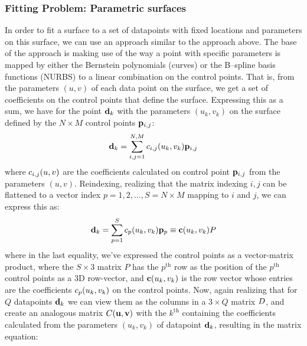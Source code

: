 \subsubsection{Fitting Problem: Parametric surfaces}
In order to fit a \Bez surface to a set of datapoints with fixed locations and parameters on this surface, we can use an approach similar to the approach above. The base of the approach is making use of the way a point with specific parameters is mapped by either the Bernstein polynomials (\Bez curves) or the B--spline basis functions (NURBS) to a linear combination on the control points. That is, from the parameters $(u,v)$ of each data point on the surface, we get a set of coefficients on the control points that define the surface. Expressing this as a sum, we have for the point $\lsDataPointi{k}$ with the parameters $(u_k,v_k)$ on the surface defined by the $N \times M$ control points $\lsControlPointi{i,j}$:
\begin{equation}
\lsDataPointi{k} = \sum\limits_{i,j=1}^{N,M} \lsControlPointCoefi{i,j}(u_k,v_k) \lsControlPointi{i,j}
\end{equation} 
where $\lsControlPointCoefi{i,j}(u,v)$ are the coefficients calculated on control point $\lsControlPointi{i,j}$ from the parameters $(u,v)$. Reindexing, realizing that the matrix indexing $i,j$ can be flattened to a vector index $p = 1,2,...,S=N\times M$ mapping to $i$ and $j$, we can express this as:
\begin{equation}
\lsDataPointi{k} = \sum\limits_{p=1}^{S} \lsControlPointCoefi{p}(u_k,v_k) \lsControlPointi{p} \equiv \vec{\lsControlPointCoef}(u_k,v_k)\lsControlPointMatrix
\label{eqn:lsmatrix1}
\end{equation} 
where in the last equality, we've expressed the control points as a vector-matrix product, where the $S\times 3$ matrix $P$ has the $p^\text{th}$ row as the position of the $p^\text{th}$ control points as a 3D row-vector, and $\vec{\lsControlPointCoef}(u_k,v_k)$ is the row vector whose entries are the coefficients $\lsControlPointCoefi{p}(u_k,v_k)$ on the control points. Now, again realizing that for $Q$ datapoints $\lsDataPointi{k}$ we can view them as the columns in a $3\times Q$ matrix $\lsDataPointMatrix$, and create an analogous matrix $\lsControlPointCoefMatrix(\vec{u},\vec{v})$ with the $k^\text{th}$ containing the coefficients calculated from the parameters $(u_k,v_k)$ of datapoint $\lsDataPointi{k}$, resulting in the matrix equation:


